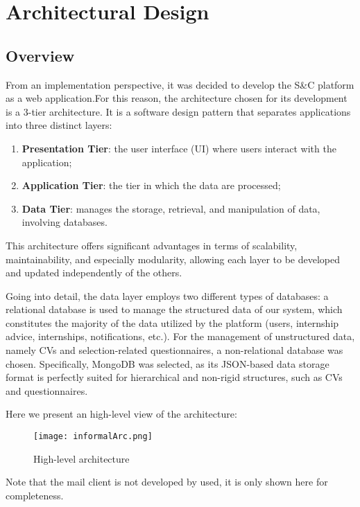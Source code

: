 \chapter{Architectural Design}
	\section{Overview}
		From an implementation perspective, it was decided to develop the S\&C platform as a web application.For this reason, the architecture chosen for its development is a 3-tier architecture. It is a software design pattern that separates applications into three distinct layers:
		\begin{enumerate}
			\item \textbf{Presentation Tier}: the user interface (UI) where users interact with the application;
			\item \textbf{Application Tier}: the tier in which the data are processed;
			\item \textbf{Data Tier}: manages the storage, retrieval, and manipulation of data, involving databases.
		\end{enumerate}
		
		This architecture offers significant advantages in terms of scalability, maintainability, and especially modularity, allowing each layer to be developed and updated independently of the others.
		
		Going into detail, the data layer employs two different types of databases: a relational database is used to manage the structured data of our system, which constitutes the majority of the data utilized by the platform (users, internship advice, internships, notifications, etc.). For the management of unstructured data, namely CVs and selection-related questionnaires, a non-relational database was chosen. Specifically, MongoDB was selected, as its JSON-based data storage format is perfectly suited for hierarchical and non-rigid structures, such as CVs and questionnaires.
		
		Here we present an high-level view of the architecture:
		\begin{figure}[H]
			\centering
			\caption{High-level architecture}
			\texttt{[image: informalArc.png]}
		\end{figure}
		
		Note that the mail client is not developed by used, it is only shown here for completeness.
